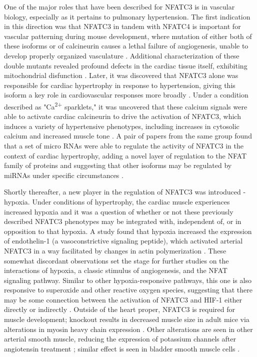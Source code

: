 One of the major roles that have been described for NFATC3 is in vascular biology, especially as it pertains to pulmonary hypertension. The first indication in this direction was that NFATC3 in tandem with NFATC4 is important for vascular patterning during mouse development, where mutation of either both of these isoforms or of calcineurin causes a lethal failure of angiogenesis, unable to develop properly organized vasculature \citep{Graef2001}. Additional characterization of these double mutants revealed profound defects in the cardiac tissue itself, exhibiting mitochondrial disfunction \citep{Kegley2001, Bushdid2003}. Later, it was discovered that NFATC3 alone was responsible for cardiac hypertrophy in response to hypertension, giving this isoform a key role in cardiovascular responses more broadly \citep{Wilkins2002}. Under a condition described as "Ca\textsuperscript{2+} sparklets," it was uncovered that these calcium signals were able to activate cardiac calcineurin to drive the activation of NFATC3, which induces a variety of hypertensive phenotypes, including increases in cytosolic calcium and increased muscle tone \citep{NievesCintron2007}. A pair of papers from the same group found that a set of micro RNAs were able to regulate the activity of NFATC3 in the context of cardiac hypertrophy, adding a novel layer of regulation to the NFAT family of proteins and suggesting that other isoforms may be regulated by miRNAs under specific circumstances \citep{Lin2009, Wang2010}. 

Shortly thereafter, a new player in the regulation of NFATC3 was introduced - hypoxia. Under conditions of hypertrophy, the cardiac muscle experiences increased hypoxia and it was a question of whether or not these previously described NFATC3 phenotypes may be integrated with, independent of, or in opposition to that hypoxia. A study found that hypoxia increased the expression of endothelin-1 (a vasoconstrictive signaling peptide), which activated arterial NFATC3 in a way facilitated by changes in actin polymerization \citep{deFrutos2011}. These somewhat discordant observations set the stage for further studies on the interactions of hypoxia, a classic stimulus of angiogenesis, and the NFAT signaling pathway. Similar to other hypoxia-responsive pathways, this one is also responsive to superoxide and other reactive oxygen species, suggesting that there may be some connection between the activation of NFATC3 and HIF-1\textalpha{} either directly or indirectly \citep{RamiroDiaz2014}. Outside of the heart proper, NFATC3 is required for muscle development; knockout results in decreased muscle size in adult mice via alterations in myosin heavy chain expression \citep{Kegley2001, Delling2000}. Other alterations are seen in other arterial smooth muscle, reducing the expression of potassium channels after angiotensin treatment \citep{Stevenson2001, Amberg2004}; similar effect is seen in bladder smooth muscle cells \citep{Layne2008}. 

